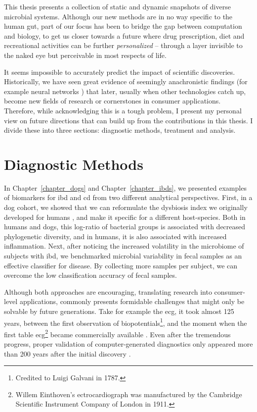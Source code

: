 This thesis presents a collection of static and dynamic snapshots of diverse
microbial systems. Although our new methods are in no way specific to the human
gut, part of our focus has been to bridge the gap between computation and
biology, to get us closer towards a future where drug prescription, diet and
recreational activities can be further \textit{personalized} -- through a layer
invisible to the naked eye but perceivable in most respects of life.

It seems impossible to accurately predict the impact of scientific discoveries.
Historically, we have seen great evidence of seemingly anachronistic findings 
(for example neural networks \cite{Tem10}) that later, usually when other 
technologies catch up, become new fields of research or cornerstones in 
consumer applications.  Therefore, while acknowledging this is a tough problem, 
I present my personal view on future directions that can build up from the 
contributions in this thesis. I divide these into three sections: diagnostic 
methods, treatment and analysis.

\section{Diagnostic Methods}

In Chapter~\ref{chapter_dogs} and Chapter~\ref{chapter_ibds}, we presented
examples of biomarkers for \gls{ibd} and \gls{cd} from two different analytical 
perspectives.  First, in a dog cohort, we showed that we can reformulate the 
dysbiosis index we originally developed for humans \cite{RN154}, and make 
it specific for a different host\hyp{}species. Both in humans and dogs, this 
log-ratio of bacterial groups is associated with decreased phylogenetic 
diversity, and in humans, it is also associated with increased inflammation.  
Next, after noticing the increased volatility in the microbiome of subjects 
with \gls{ibd}, we benchmarked microbial variability in fecal samples as an 
effective classifier for disease. By collecting more samples per subject, we 
can overcome the low classification accuracy of fecal samples.

Although both approaches are encouraging, translating research into 
consumer\hyp{}level applications, commonly presents formidable challenges that 
might only be solvable by future generations.  Take for example the \gls{ecg}, 
it took almost 125 years, between the first observation of 
biopotentials\footnote{Credited to Luigi Galvani in 1787.}, and the moment when 
the first table \gls{ecg}\footnote{Willem Einthoven's ectrocardiograph was 
manufactured by the Cambridge Scientific Instrument Company of London in 1911.} 
became commercially available \cite{ECGZywietz}. Even after the tremendous 
progress, proper validation of computer-generated diagnostics only appeared 
more than 200 years after the initial discovery \cite{njem_ecg}.

